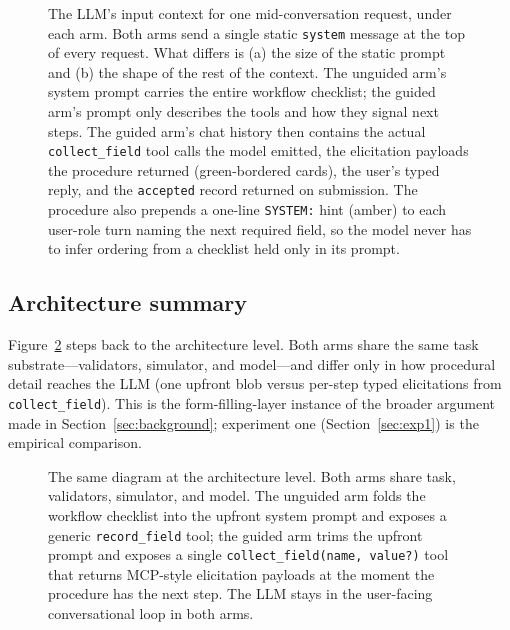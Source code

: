 \documentclass[11pt,a4paper]{article}
\begin{document}
\begin{figure}[htbp]
{\begin{tikzpicture}[
    font=\sffamily,
    node distance=2mm and 6mm,
    msgRow/.style={inner sep=0pt},
]
\end{tikzpicture}%
}
\caption{The LLM's input context for one mid-conversation request, under each
arm. Both arms send a single static \texttt{system} message at the top of every
request. What differs is (a) the size of the static prompt and (b) the shape of
the rest of the context. The unguided arm's system prompt carries the entire
workflow checklist; the guided arm's prompt only describes the tools and how
they signal next steps. The guided arm's chat history then contains the actual
\texttt{collect\_field} tool calls the model emitted, the elicitation payloads
the procedure returned (green-bordered cards), the user's typed reply, and the
\texttt{accepted} record returned on submission. The procedure also prepends a
one-line \texttt{SYSTEM:} hint (amber) to each user-role turn naming the next
required field, so the model never has to infer ordering from a checklist held
only in its prompt.}
\label{fig:context}
\end{figure}

\subsection{Architecture summary}

Figure~\ref{fig:policy} steps back to the architecture level. Both arms share the same task substrate---validators, simulator, and model---and differ only in how procedural detail reaches the LLM (one upfront blob versus per-step typed elicitations from \texttt{collect\_field}). This is the form-filling-layer instance of the broader argument made in Section~\ref{sec:background}; experiment one (Section~\ref{sec:exp1}) is the empirical comparison.

\begin{figure}[htbp]
  \centering
  \resizebox{\linewidth}{!}{}
  \caption{The same diagram at the architecture level. Both arms share
  task, validators, simulator, and model. The unguided arm folds the workflow
  checklist into the upfront system prompt and exposes a generic
  \texttt{record\_field} tool; the guided arm trims the upfront prompt and
  exposes a single \texttt{collect\_field(name, value?)} tool that returns
  MCP-style elicitation payloads at the moment the procedure has the next
  step. The LLM stays in the user-facing conversational loop in both arms.}
  \label{fig:policy}
\end{figure}

\end{document}
